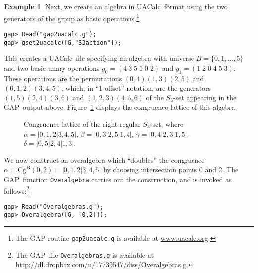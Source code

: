 \documentclass[cm,dissertation,actual,final]{uhthesis}
\theoremstyle{plain}
\theoremstyle{definition}
\newtheorem{example}[theorem]{Example}
\theoremstyle{remark}
\numberwithin{theorem}{section}
\numberwithin{claim}{chapter}
\numberwithin{equation}{section}
\numberwithin{conjecture}{chapter}
\newcommand{\<}{\ensuremath{\langle}}
\renewcommand{\>}{\ensuremath{\rangle}}
\newcommand{\Cg}{\ensuremath{\mathrm{Cg}}}
\newcommand{\GAP}{\textsf{GAP}}
\newcommand{\uacalc}{\textsf{UACalc}}
\newcommand{\0}{\ensuremath{\mathbf{0}}}
\newcommand{\1}{\ensuremath{\mathbf{1}}}
\newcommand{\2}{\ensuremath{\mathbf{2}}}
\newcommand{\3}{\ensuremath{\mathbf{3}}}
\newcommand{\4}{\ensuremath{\mathbf{4}}}
\newcommand{\5}{\ensuremath{\mathbf{5}}}
\newcommand{\bB}{\ensuremath{\mathbf{B}}}
\begin{document}
\begin{example}
  \noindent Next, we create an algebra
  in \uacalc\ format using the two generators of the
  group as basic operations.\footnote{The GAP
  routine {\tt gap2uacalc.g} is available at \url{www.uacalc.org}.}
  {\footnotesize
\begin{verbatim}
gap> Read("gap2uacalc.g");
gap> gset2uacalc([G,"S3action"]);
\end{verbatim}
}
  \noindent This creates a \uacalc\ file %
  specifying an algebra with universe $B = \{0, 1, \dots, 5\}$ and two
  basic unary operations $g_0 = (4\; 3\;  5\;  1\;  0\;  2)$ and $g_1 = (1\;  2 \; 0\;  4\;  5\;  3)$.
  These operations are the permutations $(0,4)(1,3)(2,5)$ and $(0,1,2)(3,4,5)$, which, in 
  ``1-offset'' notation, are the generators $(1,5)(2,4)(3,6)$ and $(1,2,3)(4,5,6)$
  of the $S_3$-set appearing in the \GAP\ output above.
  Figure~\ref{fig:ConS3} displays the congruence lattice of this algebra.

  \begin{figure}[h!]
    \centering
    \caption{Congruence lattice of the right regular $S_3$-set, where
      $\alpha = | 0, 1, 2 | 3, 4, 5|$,
      $\beta = | 0, 3 | 2, 5 | 1, 4 |$,
      $\gamma = | 0, 4| 2, 3| 1, 5|$, 
      $\delta = | 0, 5| 2, 4| 1, 3|$.
    }
    \label{fig:ConS3}
  \end{figure}

  We now construct an overalgebra which ``doubles'' the congruence $\alpha =
  \Cg^\bB(0,2) = | 0, 1, 2 | 3, 4, 5|$ by choosing intersection points 0 and 2.
  The \GAP\ function {\tt Overalgebra} carries out the construction, and is invoked
  as follows:\footnote{The \GAP\ file 
  {\tt Overalgebras.g} is available at \url{http://dl.dropbox.com/u/17739547/diss/Overalgebras.g}.}

  {\footnotesize
\begin{verbatim}
gap> Read("Overalgebras.g");
gap> Overalgebra([G, [0,2]]);
\end{verbatim}
  }


\end{example}
\end{document}
